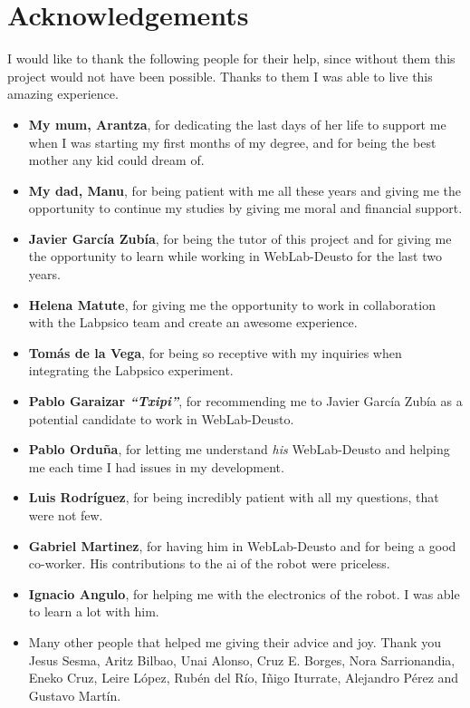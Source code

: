 \chapter*{Acknowledgements}

I would like to thank the following people for their help, since without them this project would not
have been possible. Thanks to them I was able to live this amazing experience.

\begin{itemize}
	\item \textbf{My mum, Arantza}, for dedicating the last days of her life to support me when I
	was starting my first months of my degree, and for being the best mother any kid could dream of.

	\item \textbf{My dad, Manu}, for being patient with me all these years and giving me the
	opportunity to continue my studies by giving me moral and financial support.

	\item \textbf{Javier García Zubía}, for being the tutor of this project and for giving me the
	opportunity to learn while working in WebLab-Deusto for the last two years.

	\item \textbf{Helena Matute}, for giving me the opportunity to work in collaboration with the
	Labpsico team and create an awesome experience.

	\item \textbf{Tomás de la Vega}, for being so receptive with my inquiries when integrating the
	Labpsico experiment.

	\item \textbf{Pablo Garaizar \emph{``Txipi''}}, for recommending me to Javier García Zubía as a
	potential candidate to work in WebLab-Deusto.

	\item \textbf{Pablo Orduña}, for letting me understand \emph{his} WebLab-Deusto and helping me
	each time I had issues in my development.

	\item \textbf{Luis Rodríguez}, for being incredibly patient with all my questions, that were not
	few.

	\item \textbf{Gabriel Martinez}, for having him in WebLab-Deusto and for being a good co-worker.
	His contributions to the \acrshort{ai} of the robot were priceless.

	\item \textbf{Ignacio Angulo}, for helping me with the electronics of the robot. I was able to
	learn a lot with him.

	\item Many other people that helped me giving their advice and joy. Thank you Jesus Sesma, Aritz
	Bilbao, Unai Alonso, Cruz E. Borges, Nora Sarrionandia, Eneko Cruz, Leire López, Rubén del Río,
	Iñigo Iturrate, Alejandro Pérez and Gustavo Martín.
\end{itemize}

